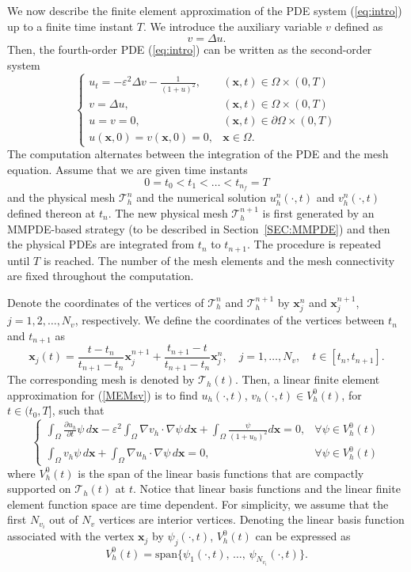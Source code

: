 \documentclass{siamart0516}
\renewcommand{\eqref}[1]{(\ref{#1})}
\newcommand{\eps}{\varepsilon}
\newcommand{\bx}{\mathbf{x}}
\newcommand{\ds}[0]{\displaystyle}
\theoremstyle{plain}%
\theoremstyle{definition}
\theoremstyle{remark}
\begin{document}
We now describe the finite element approximation of the PDE system \eqref{eq:intro} up to a finite time instant $T$.
We introduce the auxiliary variable $v$ defined as
\[
v = \Delta u.
\]
Then, the fourth-order PDE \eqref{eq:intro} can be written as the second-order system
\begin{equation}
\begin{cases}
u_t = -\eps^2 \Delta v - \ds\frac{1}{(1+u)^2}, & (\bx, t) \in \Omega \times (0,T) \\[5pt]
v = \Delta u, & (\bx, t) \in \Omega \times (0,T)\\[5pt]
u = v = 0, & (\bx, t) \in \partial \Omega \times (0,T) \\[5pt]
u(\bx,0) = v(\bx,0) = 0, & \bx \in \Omega .
\end{cases}
\label{MEMsv}
\end{equation}
The computation alternates between the integration of the PDE and the mesh equation.
Assume that we are given time instants
\[
0 = t_0 < t_1 < \ldots < t_{n_f} = T
\]
and the physical mesh $ \mathcal{T}_h^n$ and the numerical solution $u_h^n(\cdot,t)$
and $v_h^n(\cdot,t)$ defined thereon at $t_n$.
The new physical mesh $ \mathcal{T}_h^{n+1}$ is first generated by an MMPDE-based strategy
(to be described in Section~\ref{SEC:MMPDE}) and then the physical PDEs are integrated
from $t_n$ to $t_{n+1}$.  The procedure is repeated until $T$ is reached.
The number of the mesh elements and the mesh connectivity are fixed throughout the computation.

Denote the coordinates of the vertices of $ \mathcal{T}_h^{n}$ and $ \mathcal{T}_h^{n+1}$ by
$\bx_j^n$ and $\bx_j^{n+1}$, $j = 1, 2, \ldots, N_v$, respectively. We define the coordinates of the vertices
between $t_{n}$ and $t_{n+1}$ as
\[
\bx_j(t) = \frac{t - t_n}{t_{n+1} - t_n} \bx_j^{n+1}+ \frac{t_{n+1} - t}{t_{n+1} - t_n}\bx_j^n,\quad j = 1,\ldots,N_v,
\quad t \in [t_n, t_{n+1}].
\]
The corresponding mesh is denoted by $\mathcal{T}_h(t)$.
Then, a linear finite element approximation for (\ref{MEMsv}) is to find $u_h(\cdot,t)$, $v_h(\cdot,t) \in V_h^0(t)$,
for $t \in (t_0, T]$, such that
\begin{equation}
\begin{cases}
\ds\int_{\Omega} \frac{\partial u_h}{\partial t} \psi\, d\bx - \eps^2 \ds\int_{\Omega} \nabla v_h \cdot \nabla \psi\, d\bx + \ds\int_{\Omega} \ds\frac{\psi}{(1+u_h)^2} d\bx = 0, & \forall \psi \in V_h^0(t) \\[10pt]
\ds\int_{\Omega} v_h \psi\, d\bx + \int_{\Omega} \nabla u_h \cdot \nabla \psi\, d\bx = 0, & \forall \psi \in V_h^{0}(t)
\end{cases}
\label{mem-fem}
\end{equation}
where $V_h^0(t)$ is the span of the linear basis functions that are compactly supported on $\mathcal{T}_h(t)$
at $t$. Notice that linear basis functions and the linear finite element function space are time dependent.
For simplicity, we assume that the first $N_{v_i}$ out of $N_v$ vertices are interior vertices.
Denoting the linear basis function associated with the vertex $\bx_j$ by $\psi_{j}(\cdot,t)$, $V_h^0(t)$
can be expressed as
\[
V_h^0(t) = \text{span}\{\psi_1(\cdot,t),\, \ldots,\,\psi_{N_{v_i}}(\cdot,t)\}.
\]
\end{document}
